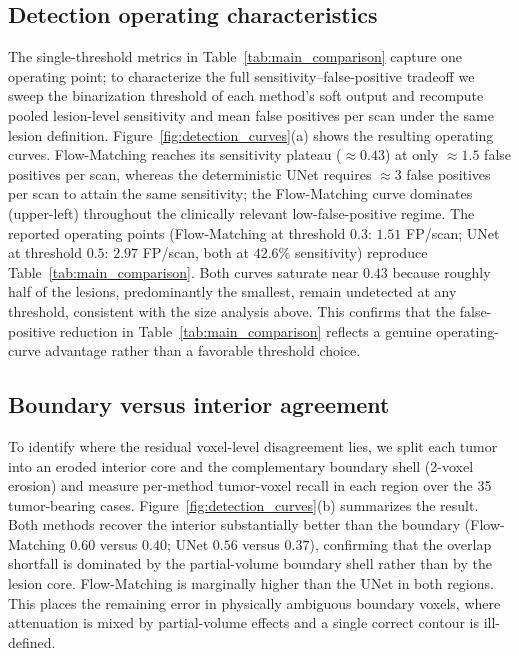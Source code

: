 \documentclass{iopjournal}
\begin{document}
\subsection{Detection operating characteristics}\label{sec:operating}
The single-threshold metrics in Table~\ref{tab:main_comparison} capture one operating point; to characterize the full sensitivity--false-positive tradeoff we sweep the binarization threshold of each method's soft output and recompute pooled lesion-level sensitivity and mean false positives per scan under the same lesion definition. Figure~\ref{fig:detection_curves}(a) shows the resulting operating curves. Flow-Matching reaches its sensitivity plateau ($\approx 0.43$) at only $\approx 1.5$ false positives per scan, whereas the deterministic UNet requires $\approx 3$ false positives per scan to attain the same sensitivity; the Flow-Matching curve dominates (upper-left) throughout the clinically relevant low-false-positive regime. The reported operating points (Flow-Matching at threshold $0.3$: $1.51$ FP/scan; UNet at threshold $0.5$: $2.97$ FP/scan, both at $42.6\%$ sensitivity) reproduce Table~\ref{tab:main_comparison}. Both curves saturate near $0.43$ because roughly half of the lesions, predominantly the smallest, remain undetected at any threshold, consistent with the size analysis above. This confirms that the false-positive reduction in Table~\ref{tab:main_comparison} reflects a genuine operating-curve advantage rather than a favorable threshold choice.

\subsection{Boundary versus interior agreement}\label{sec:boundary}
To identify where the residual voxel-level disagreement lies, we split each tumor into an eroded interior core and the complementary boundary shell (2-voxel erosion) and measure per-method tumor-voxel recall in each region over the 35 tumor-bearing cases. Figure~\ref{fig:detection_curves}(b) summarizes the result. Both methods recover the interior substantially better than the boundary (Flow-Matching $0.60$ versus $0.40$; UNet $0.56$ versus $0.37$), confirming that the overlap shortfall is dominated by the partial-volume boundary shell rather than by the lesion core. Flow-Matching is marginally higher than the UNet in both regions. This places the remaining error in physically ambiguous boundary voxels, where attenuation is mixed by partial-volume effects and a single correct contour is ill-defined.
\end{document}
